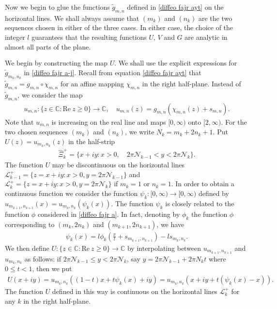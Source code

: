 \documentclass[12pt]{amsart}
\numberwithin{equation}{section}
\begin{document}
Now we begin to glue the functions $\tilde{g}_{m,n}$ defined in \eqref{diffeo  fajr  ayt} on the horizontal lines. We shall always assume that $(m_k)$ and $(n_k)$ are the two sequences chosen in either of the three cases. In either case, the choice of the integer $l$ guarantees that the resulting functions $U$, $V$ and $G$ are analytic in almost all parts of the plane.

We begin by constructing the map $U$. We shall use the explicit expressions for $\tilde{g}_{m_k,n_k}$ in \eqref{diffeo  fajr  a-j}. Recall from equation \eqref{diffeo  fajr  ayt} that $\tilde{g}_{m,n}=g_{m,n}\circ\chi_{m,n}$ for an affine mapping $\chi_{m,n}$ in the right half-plane. Instead of $\tilde{g}_{m,n}$, we consider the map
\begin{equation*}
\begin{split}
u_{m,n}: \{z\in\mathbb{C}: \text{Re}\ z\geq0 \}\to\mathbb{C}, \quad u_{m,n}(z)=g_{m,n}(\chi_{m,n}(z)+s_{m,n}).
\end{split}
\end{equation*}
Note that $u_{m,n}$ is increasing on the real line and maps $[0,\infty)$ onto $[2,\infty)$. For the two chosen sequences $(m_k)$ and $(n_k)$, we write $N_k=m_k+2n_k+1$. Put $U(z)=u_{m_k,n_k}(z)$ in the half-strip
\begin{equation}\label{halfstrip-1}
\begin{split}
\hat{\Xi}_k^{+}=\{x+iy: x>0, \quad  2\pi\mathcal{N}_{k-1}<y<2\pi\mathcal{N}_k\}.
\end{split}
\end{equation}
The function $U$ may be discontinuous on the horizontal lines $\mathcal{L}^{+}_{k-1}=\{z=x+iy: x>0, y=2\pi\mathcal{N}_{k-1}\}$ and $\mathcal{L}^{+}_k=\{z=x+iy: x>0, y=2\pi\mathcal{N}_{k}\}$ if $m_k=1$ or $n_k=1$. In order to obtain a continuous function we consider the function $\psi_k:[0,\infty)\to[0,\infty)$ defined by $u_{m_{k+1},n_{k+1}}(x)=u_{m_k,n_k}(\psi_k(x))$. The function $\psi_k$ is closely related to the function $\phi$ considered in \eqref{diffeo  fajr  a}. In fact, denoting by $\phi_k$ the function $\phi$ corresponding to $(m_k,2n_k)$ and $(m_{k+1},2n_{k+1})$, we have
\begin{equation}\label{recuree1pm-diff-00}
\begin{split}
\psi_k(x)=l\phi_k\left(\frac{x}{l}+s_{m_{k+1},n_{k+1}}\right)-ls_{m_{k},n_{k}}.
\end{split}
\end{equation}
We then define $U:\{z\in\mathbb{C}: \text{Re}\ z\geq 0\}\to \mathbb{C}$ by interpolating between $u_{m_{k+1},n_{k+1}}$ and $u_{m_{k},n_{k}}$ as follows: if $2\pi \mathcal{N}_{k-1}\leq y<2\pi\mathcal{N}_k$, say $y=2\pi \mathcal{N}_{k-1}+2\pi N_kt$ where $0\leq t<1$, then we put
\begin{equation*}
\begin{split}
U(x+iy)=u_{m_{k},n_{k}}((1-t)x+t\psi_k(x)+iy)=u_{m_{k},n_{k}}(x+iy+t(\psi_k(x)-x)).
\end{split}
\end{equation*}
The function $U$ defined in this way is continuous on the horizontal lines $\mathcal{L}^{+}_k$ for any $k$ in the right half-plane.
\end{document}
